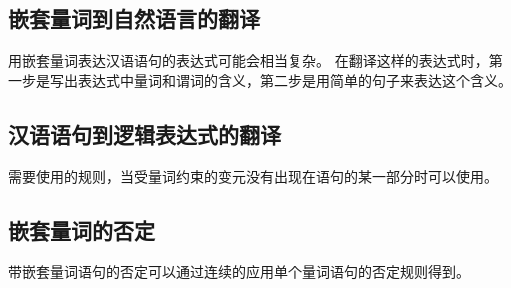     \subsection{嵌套量词到自然语言的翻译}
    {
        用嵌套量词表达汉语语句的表达式可能会相当复杂。
        在翻译这样的表达式时，第一步是写出表达式中量词和谓词的含义，第二步是用简单的句子来表达这个含义。
    }

    \subsection{汉语语句到逻辑表达式的翻译}
    {
        需要使用的规则，当受量词约束的变元没有出现在语句的某一部分时可以使用。
    }

    \subsection{嵌套量词的否定}
    {
        带嵌套量词语句的否定可以通过连续的应用单个量词语句的否定规则得到。
    }

